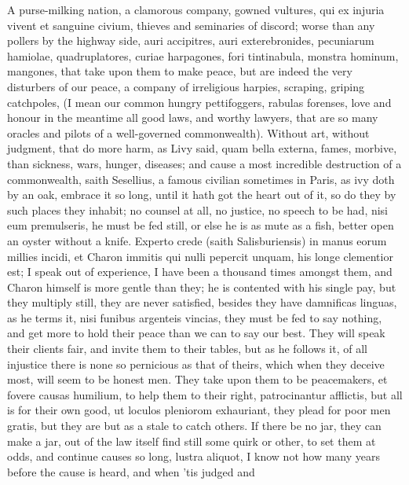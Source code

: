 {A purse-milking nation, a clamorous company, gowned vultures, qui
ex injuria vivent et sanguine civium, thieves and seminaries of
discord; worse than any pollers by the highway side, auri accipitres,
auri exterebronides, pecuniarum hamiolae, quadruplatores, curiae
harpagones, fori tintinabula, monstra hominum, mangones, \etc{} that take
upon them to make peace, but are indeed the very disturbers of our
peace, a company of irreligious harpies, scraping, griping catchpoles,
(I mean our common hungry pettifoggers, rabulas forenses, love and
honour in the meantime all good laws, and worthy lawyers, that are so
many oracles and pilots of a well-governed commonwealth). Without
art, without judgment, that do more harm, as Livy said, quam bella
externa, fames, morbive, than sickness, wars, hunger, diseases; and
cause a most incredible destruction of a commonwealth, saith
Sesellius, a famous civilian sometimes in Paris, as ivy doth by an
oak, embrace it so long, until it hath got the heart out of it, so do
they by such places they inhabit; no counsel at all, no justice, no
speech to be had, nisi eum premulseris, he must be fed still, or else
he is as mute as a fish, better open an oyster without a knife. Experto
crede (saith  Salisburiensis) in manus eorum millies incidi, et
Charon immitis qui nulli pepercit unquam, his longe clementior est; I
speak out of experience, I have been a thousand times amongst them, and
Charon himself is more gentle than they; he is contented with his
single pay, but they multiply still, they are never satisfied, besides
they have damnificas linguas, as he terms it, nisi funibus argenteis
vincias, they must be fed to say nothing, and get more to hold
their peace than we can to say our best. They will speak their clients
fair, and invite them to their tables, but as he follows it, of
all injustice there is none so pernicious as that of theirs, which when
they deceive most, will seem to be honest men. They take upon them to
be peacemakers, et fovere causas humilium, to help them to their right,
patrocinantur afflictis, but all is for their own good, ut loculos
pleniorom exhauriant, they plead for poor men gratis, but they are but
as a stale to catch others. If there be no jar, they can make a
jar, out of the law itself find still some quirk or other, to set them
at odds, and continue causes so long, lustra aliquot, I know not how
many years before the cause is heard, and when 'tis judged and
}
